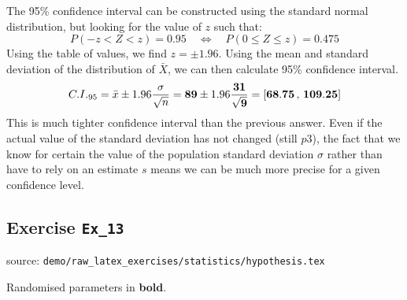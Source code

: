 \documentclass[a4paper, leqno, 12pt]{report}
\newenvironment{top_enumerate}{
\begin{enumerate}
  \setlength{\itemsep}{2em}
  \setlength{\topsep}{-0pt}
  \setlength{\partopsep}{-0pt}
}{\end{enumerate}}
\begin{document}
\begin{top_enumerate}
\begin{enumerate}
	The 95\% confidence interval can be constructed using the standard normal distribution, but looking for the value of $z$ such that:
	\[
	P(-z < Z < z) = 0.95 \quad \iff \quad P(0 \le Z \le z) = 0.475
	\]
	Using the table of values, we find $z = \pm 1.96$. Using the mean and standard deviation of the distribution of $\bar X$, we can then calculate 95\% confidence interval.
	\[
	C.I._{95} = \bar x \pm 1.96 \frac{\sigma}{\sqrt{n}} = {\bf 89} \pm 1.96 \frac{{\bf 31}}{\sqrt{{\bf 9}}} = \left[{\bf 68.75} \, , \, {\bf 109.25}\right]
	\]
	This is much tighter confidence interval than the previous answer. Even if the actual value of the standard deviation has not changed (still $p3$), the fact that we know for certain the value of the population standard deviation $\sigma$ rather than have to rely on an estimate $s$ means we can be much more precise for a given confidence level.
	 \quad \textbf{}
\end{enumerate}\newpage
\end{top_enumerate}
\subsection{Exercise \texttt{Ex\_13}}
source: \texttt{demo/raw\_latex\_exercises/statistics/hypothesis.tex}

Randomised parameters in \textbf{bold}. 
\end{document}
